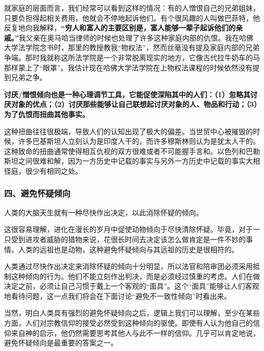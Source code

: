 就家庭的层面而言，我们经常可以看到这样的情况：有的人憎恨自己的兄弟姐妹，只要负担得起相关费用，他就会不停地起诉他们。有个很风趣的人叫做巴菲特，他反复地向我解释，\textbf{“穷人和富人的主要区别是，富人能够一辈子起诉他们的亲戚。”}我父亲在奥马哈当律师的时候也处理了许多这种家庭内部的仇恨。我在哈佛大学法学院念书时，那里的教授教我“物权法”，然而丝毫没有提及家庭内部的兄弟争端。那时我就称这所法学院是一个非常脱离现实的地方，它像古代拉牛奶车的马那样蒙上了“眼罩”。我估计现在哈佛大学法学院在上物权法课程的时候依然没有提到兄弟之争。
\par

\textbf{讨厌/憎恨倾向也是一种心理调节工具，它能促使深陷其中的人们：（1）忽略其讨厌对象的优点；（2）讨厌那些能够让自己联想起讨厌对象的人、物品和行动；（3）为了仇恨而扭曲其他事实。}
\par

这种扭曲往往很极端，导致人们的认知出现了极大的偏差。当世贸中心被摧毁的时候，许多巴基斯坦人立刻认为是印度人干的，而许多穆斯林则认为是犹太人干的。这种致命的扭曲通常使得相互仇视的双方很难或者不可能握手言和。以色列和巴勒斯坦之间很难和解，因为一方历史中记载的事实与另外一方历史中记载的事实大相径庭，很少有相同之处。
\par

\subsubsection*{四、避免怀疑倾向}

人类的大脑天生就有一种尽快作出决定，以此消除怀疑的倾向。
\par

这很容易理解，进化在漫长的岁月中促使动物倾向于尽快清除怀疑。毕竟，对于一只受到进攻者威胁的猎物来说，花很长时间去决定该怎么做肯定是一件不妙的事情。人类的远祖也是动物，这种避免怀疑倾向与其远祖的历史是很相符的。
\par

人类通过尽快作出决定来消除怀疑的倾向十分明显，所以法官和陪审团必须采用抵制这种倾向的行为。他们不能立刻作出判决，而是必须经过慎重的考虑。人们在做决定之前，必须让自己习惯于戴上一个客观的“面具”。这个“面具”能够让人们客观地看待问题，这一点我们将会在下面讨论“避免不一致性倾向”时看出来。
\par

当然，明白人类具有强烈的避免怀疑倾向之后，逻辑上我们可以理解，至少在某些方面，人们对宗教信仰的接受必然受到这种倾向的驱使。即使有人认为他自己的信仰来自神的启示，他仍然需要思考其他人与此不一样的信仰。几乎可以肯定地说，避免怀疑倾向是最重要的答案之一。
\par

